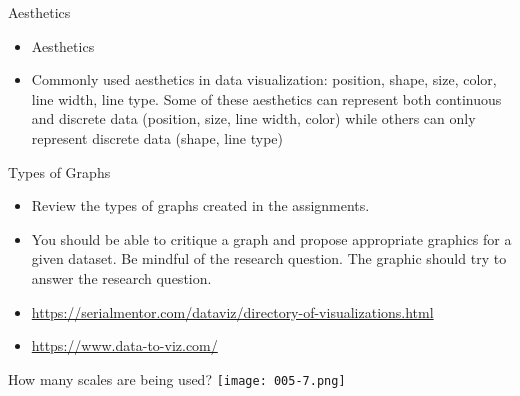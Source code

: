 \documentclass[10pt,handout]{beamer}\usepackage[]{graphicx}\usepackage[]{color}
\begin{document}
\begin{frame}{Aesthetics}
	\begin{itemize}
		\setlength\itemsep{.51em}
		\item Aesthetics
		\pause 
		\item Commonly used aesthetics in data visualization: position, shape, size, color, line width, line type. Some of these aesthetics can represent both continuous and discrete data (position, size, line width, color) while others can only represent discrete data (shape, line type)	
	\end{itemize}
\end{frame}

\begin{frame}{Types of Graphs}
	\begin{itemize}
		\item Review the types of graphs created in the assignments.
		\item You should be able to critique a graph and propose appropriate graphics for a given dataset. Be mindful of the research question. The graphic should try to answer the research question. 
		\item \url{https://serialmentor.com/dataviz/directory-of-visualizations.html}
		\item \url{https://www.data-to-viz.com/}
	\end{itemize}
\end{frame}

\begin{frame}{How many scales are being used?}
	\centering
	\texttt{[image: 005-7.png]}
\end{frame}
\end{document}
